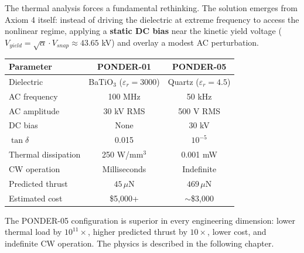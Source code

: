 The thermal analysis forces a fundamental rethinking. The solution emerges from Axiom 4 itself: instead of driving the dielectric at extreme frequency to access the nonlinear regime, applying a \textbf{static DC bias} near the kinetic yield voltage ($V_{yield} = \sqrt{\alpha} \cdot V_{snap} \approx 43.65$ kV) and overlay a modest AC perturbation.

\begin{center}
\begin{tabular}{|l|c|c|}
\hline
Parameter & PONDER-01 & PONDER-05 \\ \hline
Dielectric & BaTiO$_3$ ($\varepsilon_r = 3000$) & Quartz ($\varepsilon_r = 4.5$) \\
AC frequency & 100 MHz & 50 kHz \\
AC amplitude & 30 kV RMS & 500 V RMS \\
DC bias & None & 30 kV \\
$\tan\delta$ & 0.015 & $10^{-5}$ \\
Thermal dissipation & 250 W/mm$^3$ & 0.001 mW \\
CW operation & Milliseconds & Indefinite \\
Predicted thrust & $45\,\mu$N & $469\,\mu$N \\
Estimated cost & \$5{,}000+ & $\sim$\$3{,}000 \\
\hline
\end{tabular}
\end{center}

The PONDER-05 configuration is superior in every engineering dimension: lower thermal load by $10^{11}\times$, higher predicted thrust by $10\times$, lower cost, and indefinite CW operation. The physics is described in the following chapter.
